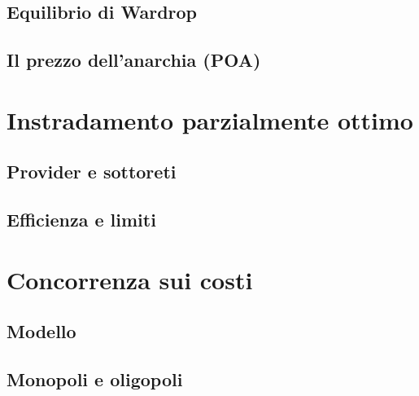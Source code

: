 \documentclass{beamer}
\theoremstyle{plain}
\theoremstyle{definition}
\theoremstyle{remark}
\begin{document}
\subsection{Equilibrio di Wardrop}

\subsection{Il prezzo dell'anarchia (POA)}


\section{Instradamento parzialmente ottimo}

\subsection{Provider e sottoreti}

\subsection{Efficienza e limiti}


\section{Concorrenza sui costi}

\subsection{Modello}

\subsection{Monopoli e oligopoli}
\end{document}
